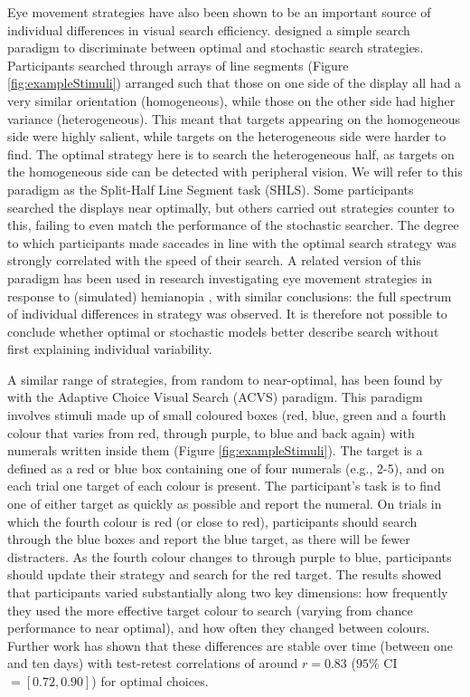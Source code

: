 \documentclass[a4paper, man, natbib, floatsintext]{apa6}
\begin{document}
Eye movement strategies have also been shown to be an important source of individual differences in visual search efficiency. \cite{nowakowska2017} designed a simple search paradigm to discriminate between optimal \citep{najemnik-geisler2008} and stochastic  \citep{clarke2016} search strategies. Participants searched through arrays of line segments (Figure \ref{fig:exampleStimuli}) arranged such that those on one side of the display all had a very similar orientation (homogeneous), while those on the other side had higher variance (heterogeneous). This meant that targets appearing on the homogeneous side were highly salient, while targets on the heterogeneous side were harder to find. The optimal strategy here is to search the heterogeneous half, as targets on the homogeneous side can be detected with peripheral vision. We will refer to this paradigm as the Split-Half Line Segment task (SHLS). Some participants searched the displays near optimally, but others carried out strategies counter to this, failing to even match the performance of the stochastic searcher. The degree to which participants made saccades in line with the optimal search strategy was strongly correlated with the speed of their search. A related version of this paradigm has been used in research investigating eye movement strategies in response to (simulated) hemianopia \citep{nowakowska2016,nowakowska2018}, with similar conclusions: the full spectrum of individual differences in strategy was observed. It is therefore not possible to conclude whether optimal or stochastic models better describe search without first explaining individual variability.

A similar range of strategies, from random to near-optimal, has been found by \cite{irons-leber2016} with the Adaptive Choice Visual Search (ACVS) paradigm. This paradigm involves stimuli made up of small coloured boxes (red, blue, green and a fourth colour that varies from red, through purple, to blue and back again) with numerals written inside them (Figure \ref{fig:exampleStimuli}). The target is a defined as a red or blue box containing one of four numerals (e.g., 2-5), and on each trial one target of each colour is present. The participant's task is to find one of either target as quickly as possible and report the numeral. On trials in which the fourth colour is red (or close to red), participants should search through the blue boxes and report the blue target, as there will be fewer distracters. As the fourth colour changes to through purple to blue, participants should update their strategy and search for the red target. The results showed that participants varied substantially along two key dimensions: how frequently they used the more effective target colour to search (varying from chance performance to near optimal), and how often they changed between colours. Further work \citep{irons-leber2018} has shown that these differences are stable over time (between one and ten days) with test-retest correlations of around $r = 0.83$ ($95\%$ CI $= [0.72, 0.90]$) for optimal choices.
\end{document}
